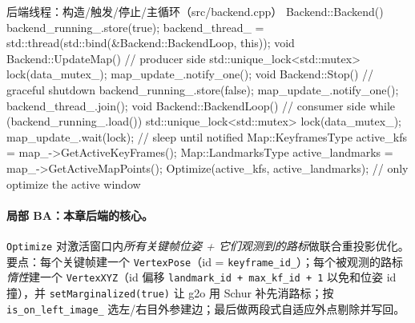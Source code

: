 \begin{codebox}[C++]{后端线程：构造/触发/停止/主循环（src/backend.cpp）}
Backend::Backend() {
    backend_running_.store(true);
    backend_thread_ = std::thread(std::bind(&Backend::BackendLoop, this));
}
void Backend::UpdateMap() {                      // producer side
    std::unique_lock<std::mutex> lock(data_mutex_);
    map_update_.notify_one();
}
void Backend::Stop() {                           // graceful shutdown
    backend_running_.store(false);
    map_update_.notify_one();
    backend_thread_.join();
}
void Backend::BackendLoop() {                    // consumer side
    while (backend_running_.load()) {
        std::unique_lock<std::mutex> lock(data_mutex_);
        map_update_.wait(lock);                  // sleep until notified
        Map::KeyframesType active_kfs       = map_->GetActiveKeyFrames();
        Map::LandmarksType active_landmarks = map_->GetActiveMapPoints();
        Optimize(active_kfs, active_landmarks); // only optimize the active window
    }
}
\end{codebox}

\paragraph{局部 BA：本章后端的核心。}
\texttt{Optimize} 对激活窗口内\emph{所有关键帧位姿 + 它们观测到的路标}做联合重投影优化。要点：每个关键帧建一个 \texttt{VertexPose}（id = \texttt{keyframe\_id\_}）；每个被观测的路标\emph{惰性}建一个 \texttt{VertexXYZ}（id 偏移 \verb|landmark_id + max_kf_id + 1| 以免和位姿 id 撞），并 \verb|setMarginalized(true)| 让 g2o 用 Schur 补先消路标；按 \texttt{is\_on\_left\_image\_} 选左/右目外参建边；最后做两段式自适应外点剔除并写回。

